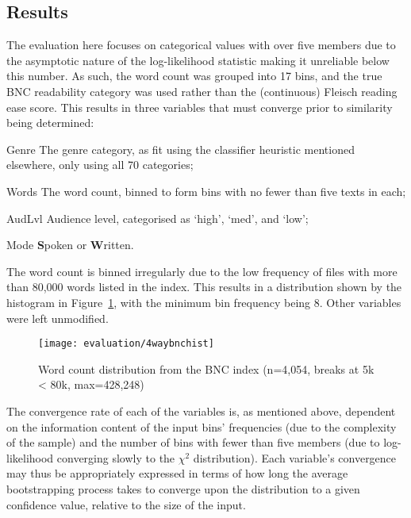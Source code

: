 \subsection{Results}

The evaluation here focuses on categorical values with over five members due to the asymptotic nature of the log-likelihood statistic making it unreliable below this number.  As such, the word count was grouped into 17 bins, and the true BNC readability category was used rather than the (continuous) Fleisch reading ease score.  This results in three variables that must converge prior to similarity being determined:

\begin{itemizeTitle}
    \item[Genre]  The genre category, as fit using the classifier heuristic mentioned elsewhere, only using all 70 categories;
    \item[Words]  The word count, binned to form bins with no fewer than five texts in each;
    \item[AudLvl] Audience level, categorised as `high', `med', and `low';
    \item[Mode]   \textbf{S}poken or \textbf{W}ritten.
\end{itemizeTitle}

The word count is binned irregularly due to the low frequency of files with more than 80,000 words listed in the index.  This results in a distribution shown by the histogram in Figure~\ref{fig:evaluation:resampling:bncwordhist}, with the minimum bin frequency being 8.  Other variables were left unmodified.


\begin{figure}[ht]
    \centering
    \texttt{[image: evaluation/4waybnchist]}
    \caption{Word count distribution from the BNC index (n=4,054, breaks at 5k < 80k, max=428,248)}
    \label{fig:evaluation:resampling:bncwordhist}
\end{figure}


The convergence rate of each of the variables is, as mentioned above, dependent on the information content of the input bins' frequencies (due to the complexity of the sample) and the number of bins with fewer than five members (due to log-likelihood converging slowly to the $\chi^2$ distribution).  Each variable's convergence may thus be appropriately expressed in terms of how long the average bootstrapping process takes to converge upon the distribution to a given confidence value, relative to the size of the input.

